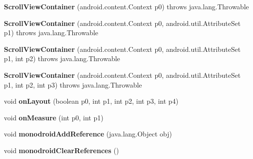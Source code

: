 \begin{DoxyCompactItemize}
\item 
\mbox{\label{classmd5b60ffeb829f638581ab2bb9b1a7f4f3f_1_1_scroll_view_container_a4da9edc9a3c476f7f6f113c21e94f2c3}} 
{\bfseries Scroll\+View\+Container} (android.\+content.\+Context p0)  throws java.\+lang.\+Throwable 	
\item 
\mbox{\label{classmd5b60ffeb829f638581ab2bb9b1a7f4f3f_1_1_scroll_view_container_a9988f00f43908c747f96baaaaf9b6220}} 
{\bfseries Scroll\+View\+Container} (android.\+content.\+Context p0, android.\+util.\+Attribute\+Set p1)  throws java.\+lang.\+Throwable 	
\item 
\mbox{\label{classmd5b60ffeb829f638581ab2bb9b1a7f4f3f_1_1_scroll_view_container_a3daf03644acbaebadff91f69061c392e}} 
{\bfseries Scroll\+View\+Container} (android.\+content.\+Context p0, android.\+util.\+Attribute\+Set p1, int p2)  throws java.\+lang.\+Throwable 	
\item 
\mbox{\label{classmd5b60ffeb829f638581ab2bb9b1a7f4f3f_1_1_scroll_view_container_a2ec1c5ba20e2c2ddccb8e2c650187f32}} 
{\bfseries Scroll\+View\+Container} (android.\+content.\+Context p0, android.\+util.\+Attribute\+Set p1, int p2, int p3)  throws java.\+lang.\+Throwable 	
\item 
\mbox{\label{classmd5b60ffeb829f638581ab2bb9b1a7f4f3f_1_1_scroll_view_container_a14c4115a2131636e6b15e7327ded3d04}} 
void {\bfseries on\+Layout} (boolean p0, int p1, int p2, int p3, int p4)
\item 
\mbox{\label{classmd5b60ffeb829f638581ab2bb9b1a7f4f3f_1_1_scroll_view_container_a31ed54d7d9fb3ae0c81c8582a15e49f4}} 
void {\bfseries on\+Measure} (int p0, int p1)
\item 
\mbox{\label{classmd5b60ffeb829f638581ab2bb9b1a7f4f3f_1_1_scroll_view_container_a36cffa5f672764a8803bbd2b7aada5a0}} 
void {\bfseries monodroid\+Add\+Reference} (java.\+lang.\+Object obj)
\item 
\mbox{\label{classmd5b60ffeb829f638581ab2bb9b1a7f4f3f_1_1_scroll_view_container_a140e7fc45e7ee876eabd1c71d9a77e80}} 
void {\bfseries monodroid\+Clear\+References} ()
\end{DoxyCompactItemize}
